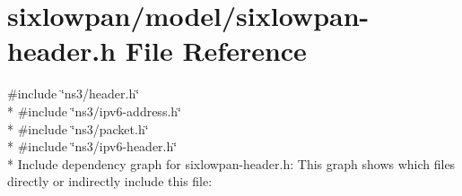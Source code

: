 \hypertarget{sixlowpan-header_8h}{}\section{sixlowpan/model/sixlowpan-\/header.h File Reference}
\label{sixlowpan-header_8h}
{\ttfamily \#include \char`\"{}ns3/header.\+h\char`\"{}}\\*
{\ttfamily \#include \char`\"{}ns3/ipv6-\/address.\+h\char`\"{}}\\*
{\ttfamily \#include \char`\"{}ns3/packet.\+h\char`\"{}}\\*
{\ttfamily \#include \char`\"{}ns3/ipv6-\/header.\+h\char`\"{}}\\*
Include dependency graph for sixlowpan-\/header.h\+:
This graph shows which files directly or indirectly include this file\+:
